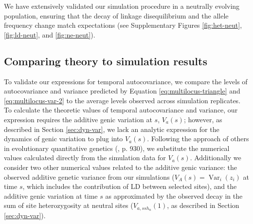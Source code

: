 \documentclass[11pt]{article}
\DeclareMathOperator{\var}{Var}
\begin{document}
We have extensively validated our simulation procedure in a neutrally evolving
population, ensuring that the decay of linkage disequilibrium and the allele
frequency change match expectations (see Supplementary Figures
\ref{fig:het-neut}, \ref{fig:ld-neut}, and \ref{fig:ne-neut}). 


\subsection{Comparing theory to simulation results}
\label{sec:ml-sim-res}

To validate our expressions for temporal autocovariance, we compare the levels
of autocovariance and variance predicted by Equation
\eqref{eq:multilocus-triangle} and \eqref{eq:multilocus-var-2} to the average
levels observed across simulation replicates. To calculate the theoretic values
of temporal autocovariance and variance, our expression requires the additive
genic variation at $s$, $V_a(s)$; however, as described in Section
\ref{sec:dyn-var}, we lack an analytic expression for the dynamics of genic
variation to plug into $V_a(s)$.  Following the approach of others in
evolutionary quantitative genetics (\cite{Turelli1994-rd}, p. 930), we
substitute the numerical values calculated directly from the simulation data
for $V_a(s)$. Additionally we consider two other numerical values related to
the additive genic variance: the observed additive genetic variance from our
simulations ($V_A(s) = \var_i(z_i)$ at time $s$, which includes the
contribution of LD between selected sites), and the additive genic variation at
time $s$ as approximated by the observed decay in the sum of site
heterozygosity at neutral sites ($V_{a,ssh_n}(1)$, as described in Section
\ref{sec:dyn-var}). 
\end{document}
